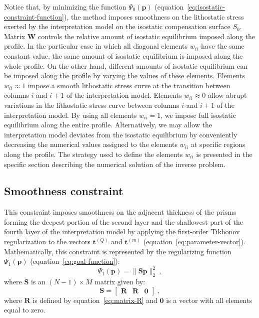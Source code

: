 \documentclass[manuscript]{geophysics}
\begin{document}
Notice that, by minimizing the function $\Psi_{0}(\mathbf{p})$ 
(equation~\ref{eq:isostatic-constraint-function}), the method imposes smoothness on 
the lithostatic stress exerted by the interpretation model on the isostatic 
compensation surface $S_{0}$.
Matrix $\mathbf{W}$ controls the relative amount of isostatic equilibrium imposed 
along the profile. 
In the particular case in which all diagonal elements $w_{ii}$ have the same
constant value, the same amount of isostatic equilibrium is imposed along the 
whole profile. On the other hand, different amounts of isostatic equilibrium
can be imposed along the profile by varying the values of these elements.
Elements $w_{ii} \approx 1$ impose a smooth lithostatic stress curve 
at the transition between columns $i$ and $i+1$ of the interpretation model.
Elements $w_{ii} \approx 0$ allow abrupt variations in the lithostatic stress 
curve between columns $i$ and $i+1$ of the interpretation model.
By using all elements $w_{ii} = 1$, we impose full isostatic equilibrium 
along the entire profile. Alternatively, we may allow the interpretation model 
deviates from the isostatic equilibrium by conveniently decreasing the numerical values
assigned to the elements $w_{ii}$ at specific regions along the profile. 
The strategy used to define the elements $w_{ii}$ is 
presented in the specific section describing the numerical solution of the inverse problem.


\subsection{Smoothness constraint}


This constraint imposes smoothness on the adjacent thickness of the prisms forming the
deepest portion of the second layer and the shallowest part of the fourth layer
of the interpretation model by applying the first-order Tikhonov regularization
\citep{aster-etal2005} to the vectors $\mathbf{t}^{(Q)}$ and $\mathbf{t}^{(m)}$ 
(equation~\ref{eq:parameter-vector}). 
Mathematically, this constraint is represented by the regularizing function
$\Psi_{1}(\mathbf{p})$ (equation~\ref{eq:goal-function}):
\begin{equation}
\Psi_{1}(\mathbf{p}) = \| \mathbf{S}\mathbf{p} \|_{2}^{2} \: ,
\label{eq:smootheness-contraint}
\end{equation}
where $\mathbf{S}$ is an $\left( N-1 \right) \times M$ matrix given by:
\begin{equation}
\mathbf{S} = \begin{bmatrix}
\mathbf{R} & \mathbf{R} & \mathbf{0}
\end{bmatrix} \: ,
\label{eq:matrix-S}
\end{equation}
where $\mathbf{R}$ is defined by equation~\ref{eq:matrix-R} and $\mathbf{0}$
is a vector with all elements equal to zero.
\end{document}
